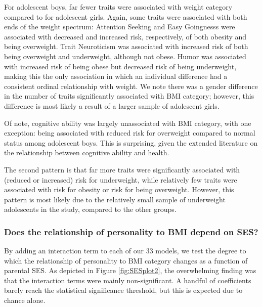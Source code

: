 \documentclass[man]{apa6}
\begin{document}
For adolescent boys, far fewer traits were associated with weight category compared to for adolescent girls. Again, some traits were associated with both ends of the weight spectrum: Attention Seeking and Easy Goingnesss were associated with decreased and increased risk, respectively, of both obesity and being overweight. Trait Neuroticism was associated with increased risk of both being overweight and underweight, although not obese. Humor was associated with increased risk of being obese but decreased risk of being underweight, making this the only association in which an individual difference had a consistent ordinal relationship with weight. We note there was a gender difference in the number of traits significantly associated with BMI category; however, this difference is most likely a result of a larger sample of adolescent girls.

Of note, cognitive ability was largely unassociated with BMI category, with one exception: being associated with reduced risk for overweight compared to normal status among adolescent boys. This is surprising, given the extended literature on the relationship between cognitive ability and health.

The second pattern is that far more traits were significantly associated with (reduced or increased) risk for underweight, while relatively few traits were associated with risk for obesity or risk for being overweight. However, this pattern is most likely due to the relatively small sample of underweight adolescents in the study, compared to the other groups.

\hypertarget{does-the-relationship-of-personality-to-bmi-depend-on-ses}{%
\subsubsection{Does the relationship of personality to BMI depend on SES?}\label{does-the-relationship-of-personality-to-bmi-depend-on-ses}}

By adding an interaction term to each of our 33 models, we test the degree to which the relationship of personality to BMI category changes as a function of parental SES. As depicted in Figure \ref{fig:SESplot2}, the overwhelming finding was that the interaction terms were mainly non-significant. A handful of coefficients barely reach the statistical significance threshold, but this is expected due to chance alone.
\end{document}
